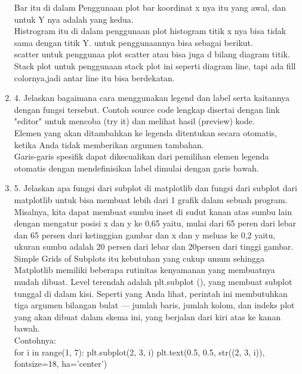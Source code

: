 \begin{enumerate}
Bar itu di dalam Penggunaan plot bar koordinat x nya itu yang awal, dan untuk Y nya adalah yang kedua.\\

Histrogram itu di dalam penggunaan plot histogram titik x nya bisa tidak sama dengan titik Y. untuk penggunaannya bisa sebagai berikut.\\

scatter untuk penggunaa plot scatter atau bisa juga d bilang diagram titik.\\

Stack plot untuk penggunaan stack plot ini seperti diagram line, tapi ada fill colornya,jadi antar line itu bisa berdekatan.\\

\item 4. Jelaskan bagaimana cara menggunakan legend dan label serta kaitannya dengan fungsi tersebut.
Contoh source code lengkap disertai dengan link "editor" untuk mencoba (try it) dan melihat hasil (preview) kode.\\

Elemen yang akan ditambahkan ke legenda ditentukan secara otomatis, ketika Anda tidak memberikan argumen tambahan.\\

Garis-garis spesifik dapat dikecualikan dari pemilihan elemen legenda otomatis dengan mendefinisikan label dimulai dengan garis bawah.\\

\item 5. Jelaskan apa fungsi dari subplot di matplotlib dan fungsi dari subplot dari matplotlib untuk bisa membuat lebih dari 1 grafik dalam sebuah program.\\

Misalnya, kita dapat membuat sumbu inset di sudut kanan atas sumbu lain dengan mengatur posisi x dan y ke 0,65 yaitu, mulai dari 65 peren dari lebar dan 65 persen  dari ketinggian gambar dan x dan y meluas ke 0,2 yaitu, ukuran sumbu adalah 20 persen  dari lebar dan 20persen dari tinggi gambar.\\

Simple Grids of Subplots itu kebutuhan yang cukup umum sehingga Matplotlib memiliki beberapa rutinitas kenyamanan yang membuatnya mudah dibuat. Level terendah adalah plt.subplot (), yang membuat subplot tunggal di dalam kisi. Seperti yang Anda lihat, perintah ini membutuhkan tiga argumen bilangan bulat — jumlah baris, jumlah kolom, dan indeks plot yang akan dibuat dalam skema ini, yang berjalan dari kiri atas ke kanan bawah.\\
Contohnya:\\
for i in range(1, 7):
    plt.subplot(2, 3, i)
    plt.text(0.5, 0.5, str((2, 3, i)),
             fontsize=18, ha='center')
             

\end{enumerate}
